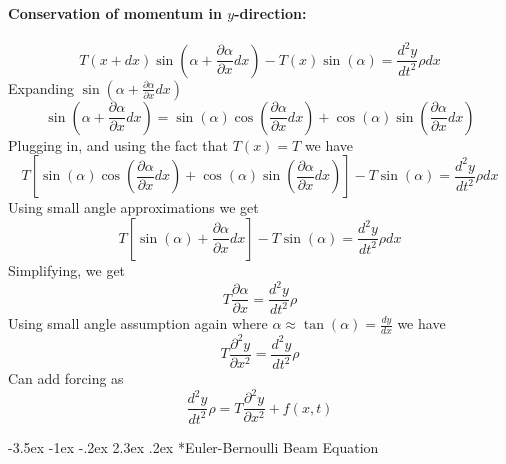 \documentclass[letterpaper,twocolumn,notitlepage]{article}
\makeatletter
\renewcommand\subsection{\@startsection{section}{1}{\z@}%
 {-3.5ex \@plus-1ex \@minus-.2ex}%
 {2.3ex \@plus.2ex}%
 {\fontsize{8pt}{8pt}\selectfont\sffamily}}
\makeatother
\begin{document}
  \paragraph{Conservation of momentum in $y$-direction:}
  \begin{equation*}
    T(x+dx)\sin\left(\alpha+\frac{\partial\alpha}{\partial x}dx\right)-T(x)\sin(\alpha)=\frac{d^{2}y}{dt^{2}}\rho dx
  \end{equation*}
  Expanding $\sin\left(\alpha+\frac{\partial\alpha}{\partial x}dx\right)$
  \begin{equation*}
    \sin\left(\alpha+\frac{\partial\alpha}{\partial x}dx\right)=\sin(\alpha)\cos\left(\frac{\partial\alpha}{\partial x}dx\right)+\cos(\alpha)\sin\left(\frac{\partial\alpha}{\partial x}dx\right)
  \end{equation*}
  Plugging in, and using the fact that $T(x)=T$ we have
  \begin{equation*}
    T\left[\sin(\alpha)\cos\left(\frac{\partial\alpha}{\partial x}dx\right)+\cos(\alpha)\sin\left(\frac{\partial\alpha}{\partial x}dx\right)\right]-T\sin(\alpha)=\frac{d^{2}y}{dt^{2}}\rho dx
  \end{equation*}
  Using small angle approximations we get
  \begin{equation*}
    T\left[\sin(\alpha)+\frac{\partial\alpha}{\partial x}dx\right]-T\sin(\alpha)=\frac{d^{2}y}{dt^{2}}\rho dx
  \end{equation*}
  Simplifying, we get
  \begin{equation*}
    T\frac{\partial\alpha}{\partial x}=\frac{d^{2}y}{dt^{2}}\rho
  \end{equation*}
  Using small angle assumption again where $\alpha\approx\tan(\alpha)=\frac{dy}{dx}$ we have
  \begin{equation*}
    \boxed{T\frac{\partial^{2}y}{\partial x^{2}}=\frac{d^{2}y}{dt^{2}}\rho}
  \end{equation*}
  Can add forcing as
  \begin{equation*}
    \frac{d^{2}y}{dt^{2}}\rho=T\frac{\partial^{2}y}{\partial x^{2}}+f(x,t)
  \end{equation*}

  \subsection*{Euler-Bernoulli Beam Equation}
\end{document}
